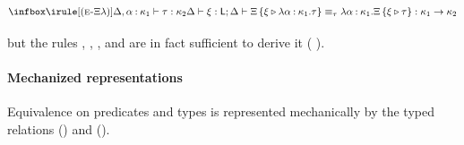 \documentclass[sigplan,screen]{acmart}
\begin{document}
{\small
\setlength{\abovedisplayskip}{-13pt}
\[
\ib{\irule[\erule{$\Xi\lambda$}]
  {\KindJ 
    {\Delta, \alpha \co \kappa_1} 
    {\tau} 
    {\kappa_2}}
  {\KindJ \Delta {\xi} {\LabK}};
  {\TEqvJ 
    {\Delta} 
    {\Xi \, {\Row {\LabTy {\xi} {\lambda \alpha \co \kappa_1. \tau}}}} 
    {\lambda \alpha \co \kappa_1. {\Xi \, {\Row {\LabTy {\xi} {\tau}}}}} 
    {\kappa_1 \to \kappa_2}}}
\]}

\Ni but the rules \erule{$\beta$}, \erule{$\eta$}, , and  are in fact sufficient to derive it (\cf{} ). 

\paragraph{Mechanized representations }
Equ\-iv\-alence on predicates and types is represented mechanically by the typed relations () and ().

\begin{AgdaAlign}
\begin{code}%
%
\>[2]\AgdaSpace{}%
\AgdaSpace{}%
\AgdaSymbol{:}\AgdaSpace{}%
\AgdaSymbol{(}\AgdaSpace{}%
\AgdaSpace{}%
\AgdaSymbol{:}\AgdaSpace{}%
\AgdaSpace{}%
\AgdaSymbol{(}\AgdaSpace{}%
\AgdaSpace{}%
\AgdaOperator{\AgdaInductiveConstructor{R[}}\AgdaSpace{}%
\AgdaSpace{}%
\AgdaOperator{\AgdaInductiveConstructor{]}}\AgdaSymbol{))}\AgdaSpace{}%
\AgdaSpace{}%
\<%
\\
%
\>[2]\AgdaSpace{}%
\AgdaSpace{}%
\AgdaSymbol{:}\AgdaSpace{}%
\AgdaSymbol{(}\AgdaSpace{}%
\AgdaSpace{}%
\AgdaSymbol{:}\AgdaSpace{}%
\AgdaSpace{}%
\AgdaSpace{}%
\AgdaSymbol{)}\AgdaSpace{}%
\AgdaSpace{}%
\<%
\end{code}
\begin{code}[hide]%
%
\>[2]\AgdaSpace{}%
\AgdaSpace{}%
\<%
\\
%
\>[2]\AgdaSpace{}%
\AgdaSpace{}%
\<%
\end{code}
\end{AgdaAlign}
\end{document}

